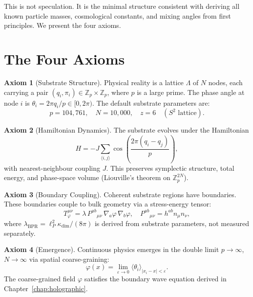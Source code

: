 \documentclass[12pt,oneside]{book}
\theoremstyle{definition}
\newtheorem{axiom}{Axiom}[chapter]
\newcommand{\lP}{\ell_P}
\begin{document}
This is not speculation. It is the minimal structure consistent with deriving all
known particle masses, cosmological constants, and mixing angles from first
principles. We present the four axioms.

\section{The Four Axioms}

\begin{axiom}[Substrate Structure]
  \label{ax:substrate}
  Physical reality is a lattice $\Lambda$ of $N$ nodes, each carrying a pair
  $(q_i, \pi_i) \in \mathbb{Z}_p \times \mathbb{Z}_p$, where $p$ is a large prime.
  The phase angle at node $i$ is $\theta_i = 2\pi q_i / p \in [0, 2\pi)$.
  The default substrate parameters are:
  \begin{equation}
    p = 104{,}761, \quad N = 10{,}000, \quad z = 6 \quad (S^2\text{ lattice}).
  \end{equation}
\end{axiom}

\begin{axiom}[Hamiltonian Dynamics]
  \label{ax:hamiltonian}
  The substrate evolves under the Hamiltonian
  \begin{equation}
    \label{eq:substrate-hamiltonian}
    H = -J \sum_{\langle i,j\rangle} \cos\!\left(\frac{2\pi(q_i - q_j)}{p}\right),
  \end{equation}
  with nearest-neighbour coupling $J$. This preserves symplectic structure,
  total energy, and phase-space volume (Liouville's theorem on $\mathbb{Z}_p^{2N}$).
\end{axiom}

\begin{axiom}[Boundary Coupling]
  \label{ax:coupling}
  Coherent substrate regions have boundaries. These boundaries couple to bulk
  geometry via a stress-energy tensor:
  \begin{equation}
    \label{eq:stress-energy-coupling}
    T^{\mu\nu}_\varphi = \lambda\, P^{ab}{}_{\mu\nu}\,\nabla_a\varphi\,\nabla_b\varphi,
    \quad P^{ab}{}_{\mu\nu} = h^{ab} n_\mu n_\nu,
  \end{equation}
  where $\lambda_{\mathrm{BPR}} = \lP^2 \kappa_{\mathrm{dim}}/(8\pi)$ is derived
  from substrate parameters, not measured separately.
\end{axiom}

\begin{axiom}[Emergence]
  \label{ax:emergence}
  Continuous physics emerges in the double limit $p \to \infty$, $N \to \infty$
  via spatial coarse-graining:
  \begin{equation}
    \label{eq:emergence}
    \varphi(x) = \lim_{\varepsilon\to 0} \langle\theta_i\rangle_{|x_i - x| < \varepsilon}.
  \end{equation}
  The coarse-grained field $\varphi$ satisfies the boundary wave equation derived
  in Chapter~\ref{chap:holographic}.
\end{axiom}
\end{document}
